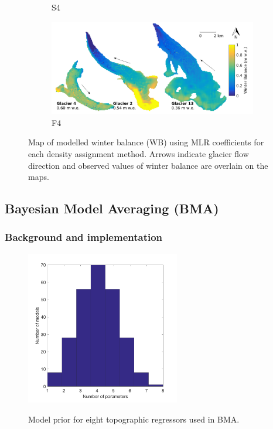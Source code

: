 \documentclass{sfuthesis}
\newcommand{\swedots}{Arrows indicate glacier flow direction and observed values of winter balance are overlain on the maps. }
\begin{document}
{\begin{figure}[H]
\begin{subfigure}[b]{0.475\textwidth}
            \caption[]%
            {{\small S4}}    
        \end{subfigure}
        \quad
        \begin{subfigure}[b]{0.475\textwidth}   
            \centering 
            \includegraphics[width=\textwidth]{MLRmap_Modelled_Observed8.png}
            \caption[]%
            {{\small F4}}    
        \end{subfigure}
        
        \caption[Map of modelled winter balance (WB) using MLR coefficients for each density assignment method]{Map of modelled winter balance (WB) using MLR coefficients for each density assignment method. \swedots} 
        \label{fig:allMLRmodelled}
    \end{figure}
    



\subsection{Bayesian Model Averaging (BMA)}
\label{sec:BMS}

\subsubsection{Background and implementation}

\begin{figure}
	\centering
	\includegraphics[width = 0.6\textwidth]{DistributionOfNumParams_topoRegress.png}\\
	\caption{Model prior for eight topographic regressors used in BMA.}
	\label{fig:uni_model_prior}
\end{figure}

}
\end{document}
